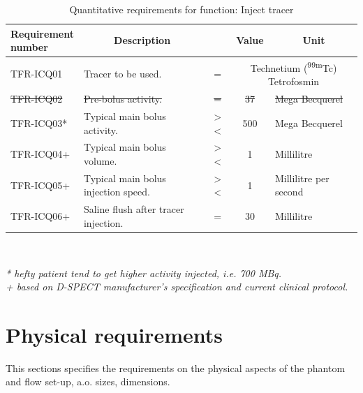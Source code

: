 \begin{table}[H]
\caption{Quantitative requirements for function: Inject tracer}
\label{tab:injtrac_quan}
\begin{tabular}{l|p{65mm}ccp{20mm}|}
	\makecell[l]{\textbf{Requirement} \\  \textbf{number}} & \multicolumn{1}{c}{\textbf{Description}} & \multicolumn{1}{c}{ } & \multicolumn{1}{c}{\textbf{Value}} & \multicolumn{1}{c}{\textbf{Unit}} \\
	\hline
	TFR-ICQ01 	& Tracer to be used. 					& = 			& \multicolumn{2}{p{35mm}|}{Technetium (\textsuperscript{99m}Tc) Tetrofosmin} \\
	\sout{TFR-ICQ02} 	& \sout{Pre-bolus activity.}					& \sout{=} 			& \sout{37}				& \sout{Mega Becquerel} \\
	TFR-ICQ03*	& Typical main bolus activity.		 	& > \spacing < 	& 500 \spacing 700 	& Mega Becquerel \\
	TFR-ICQ04+	& Typical main bolus volume. 			& > \spacing <	& 1 \spacing 2 		& Millilitre \\
	TFR-ICQ05+	& Typical main bolus injection speed.	& > \spacing < 	& 1 \spacing 2		& Millilitre per second \\
	TFR-ICQ06+	& Saline flush after tracer injection.	& =				& 30				& Millilitre \\
	\cline{2-5}
\end{tabular} \\
\raggedright
\textit{* hefty patient tend to get higher activity injected, i.e. 700 MBq.} \\
\textit{+ based on D-SPECT manufacturer's specification and current clinical protocol.}
\end{table}

\section{Physical requirements}
\label{sec:phys_req}
This sections specifies the requirements on the physical aspects of the phantom and flow set-up, a.o. sizes, dimensions.

